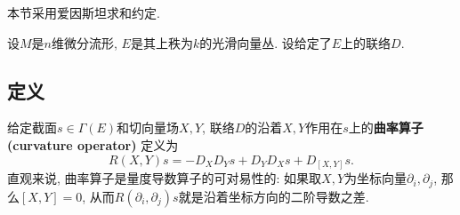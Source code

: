 

本节采用爱因斯坦求和约定.

设$M$是$n$维微分流形, $E$是其上秩为$k$的光滑向量丛. 设给定了$E$上的联络$D$.

\subsection{定义}

给定截面$s\in\Gamma(E)$和切向量场$X,Y$, 联络$D$的沿着$X,Y$作用在$s$上的\textbf{曲率算子 (curvature operator)} 定义为
$$
R(X,Y)s=-D_XD_Ys+D_YD_Xs+D_{[X,Y]}s.
$$
直观来说, 曲率算子是量度导数算子的可对易性的: 如果取$X,Y$为坐标向量$\partial_i,\partial_j$, 那么$[X,Y]=0$, 从而$R(\partial_i,\partial_j)s$就是沿着坐标方向的二阶导数之差.

